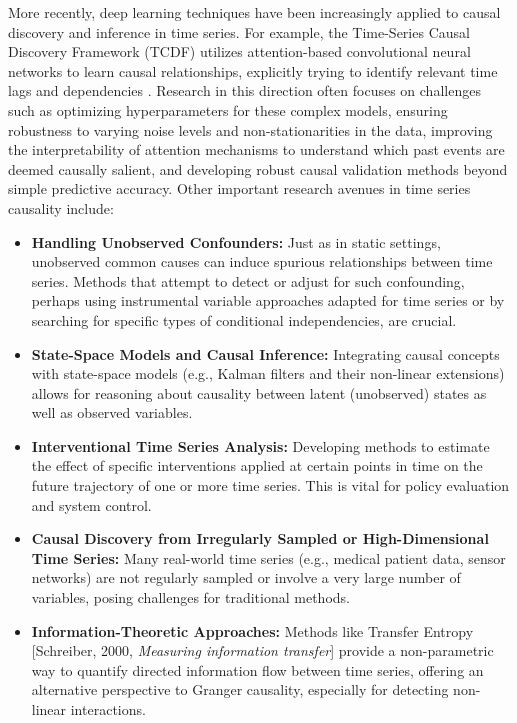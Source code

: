 {{More recently, deep learning techniques have been increasingly applied to causal discovery and inference in time series. For example, the Time-Series Causal Discovery Framework (TCDF) utilizes attention-based convolutional neural networks to learn causal relationships, explicitly trying to identify relevant time lags and dependencies \cite{Nauta2019Causal}. Research in this direction often focuses on challenges such as optimizing hyperparameters for these complex models, ensuring robustness to varying noise levels and non-stationarities in the data, improving the interpretability of attention mechanisms to understand which past events are deemed causally salient, and developing robust causal validation methods beyond simple predictive accuracy. Other important research avenues in time series causality include:
\begin{itemize}
    \item \textbf{Handling Unobserved Confounders:} Just as in static settings, unobserved common causes can induce spurious relationships between time series. Methods that attempt to detect or adjust for such confounding, perhaps using instrumental variable approaches adapted for time series or by searching for specific types of conditional independencies, are crucial.
    \item \textbf{State-Space Models and Causal Inference:} Integrating causal concepts with state-space models (e.g., Kalman filters and their non-linear extensions) allows for reasoning about causality between latent (unobserved) states as well as observed variables.
    \item \textbf{Interventional Time Series Analysis:} Developing methods to estimate the effect of specific interventions applied at certain points in time on the future trajectory of one or more time series. This is vital for policy evaluation and system control.
    \item \textbf{Causal Discovery from Irregularly Sampled or High-Dimensional Time Series:} Many real-world time series (e.g., medical patient data, sensor networks) are not regularly sampled or involve a very large number of variables, posing challenges for traditional methods.
    \item \textbf{Information-Theoretic Approaches:} Methods like Transfer Entropy [Schreiber, 2000, \textit{Measuring information transfer}] provide a non-parametric way to quantify directed information flow between time series, offering an alternative perspective to Granger causality, especially for detecting non-linear interactions.
\end{itemize}

}}
